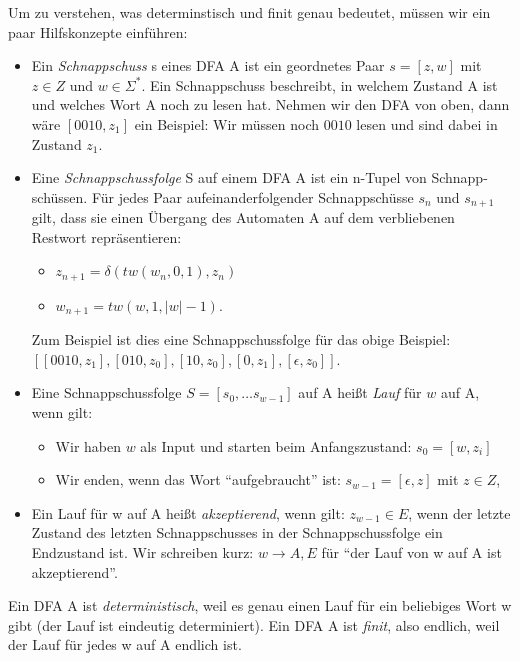 Um zu verstehen, was determinstisch und finit genau bedeutet,
müssen wir ein paar Hilfskonzepte einführen:
\begin{itemize}
    \item Ein \emph{Schnappschuss} s eines DFA A ist ein geordnetes Paar $s = [z, w]$
        mit $z \in Z$ und $w \in \Sigma^*$.
        Ein Schnappschuss beschreibt,
        in welchem Zustand A ist und welches Wort A noch zu lesen hat.
        Nehmen wir den DFA von oben, dann wäre $[0010,z_1]$ ein Beispiel:
        Wir müssen noch $0010$ lesen und sind dabei in Zustand $z_1$.
    \item Eine \emph{Schnappschussfolge} S auf einem DFA A
        ist ein n-Tupel von Schnapp-schüssen. 
        Für jedes Paar aufeinanderfolgender Schnappschüsse $s_n$ und $s_{n+1}$ gilt,
        dass sie einen Übergang des Automaten A auf dem verbliebenen Restwort repräsentieren:
        \begin{itemize}
            \item $z_{n+1} = \delta(tw(w_{n},0,1), z_n)$
            \item $w_{n+1} = tw(w,1,|w|-1)$.
        \end{itemize}
        Zum Beispiel ist dies eine Schnappschussfolge für das obige Beispiel:\linebreak
        $[[0010,z_1],[010, z_0],[10, z_0],[0,z_1],[\epsilon,z_0]]$.
    \item Eine Schnappschussfolge $S = [s_0, \ldots s_{w-1}]$ auf A
        heißt \emph{Lauf} für $w$ auf A, wenn gilt:
        \begin{itemize}
            \item Wir haben $w$ als Input und starten beim Anfangszustand:
                $s_0 = [w,z_i]$ 
            \item Wir enden, wenn das Wort ``aufgebraucht'' ist:
                $s_{w-1} = [\epsilon, z]$ mit $z \in Z$,

        \end{itemize}
    \item Ein Lauf für w auf A heißt \emph{akzeptierend}, wenn gilt:
        $z_{w-1} \in E$,
        wenn der letzte Zustand des letzten Schnappschusses in der Schnappschussfolge
        ein Endzustand ist.
        Wir schreiben kurz: $w \rightarrow A,E$
        für ``der Lauf von w auf A ist akzeptierend''. 


\end{itemize}

Ein DFA A ist \emph{deterministisch}, weil es genau einen Lauf
für ein beliebiges Wort w gibt (der Lauf ist eindeutig determiniert).
Ein DFA A ist \emph{finit}, also endlich, weil der Lauf für jedes w auf A endlich ist.

